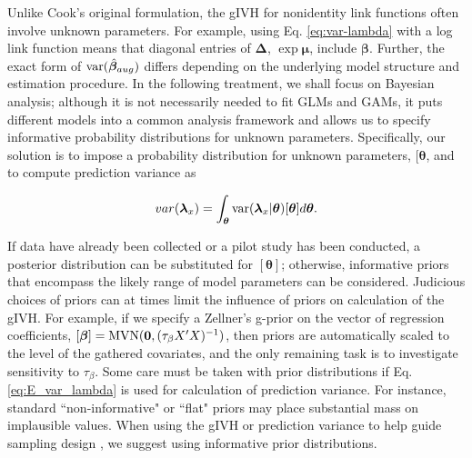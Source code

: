 \documentclass[12pt,english]{article}
\begin{document}
\begin{spacing}{1.9}
Unlike Cook's original formulation, the gIVH for nonidentity link functions often involve unknown parameters.  For example, using Eq. \ref{eq:var-lambda} with a log link function means that diagonal entries of  $\boldsymbol{\Delta}$, $\exp{\boldsymbol{\mu}}$, include $\boldsymbol{\beta}$.  Further, the exact form of ${\rm var}(\hat{\boldsymbol{\beta}}_{aug})$ differs depending on the underlying model structure and estimation procedure.  In the following treatment, we shall focus on Bayesian analysis; although it is not necessarily needed to fit GLMs and GAMs, it puts different models into a common analysis framework and allows us to specify informative probability distributions for unknown parameters.  Specifically, our solution is to impose a probability distribution for unknown parameters, $[\boldsymbol{\theta}$, and to compute prediction variance as
\begin{linenomath*}
\begin{equation}
  \label{eq:E_var_lambda}
  var(\boldsymbol{\lambda}_x) = \int_{\boldsymbol{\theta}} {\rm var}(\boldsymbol{\lambda}_x | \boldsymbol{\theta}) [\boldsymbol{\theta}] d \boldsymbol{\theta}.
\end{equation}
\end{linenomath*}

If data have already been collected or a pilot study has been conducted, a posterior distribution can be substituted for $[\boldsymbol{\theta}]$; otherwise, informative priors that encompass the likely range of model parameters can be considered.   Judicious choices of priors can at times limit the influence of priors on calculation of the gIVH.  For example, if we specify a Zellner's g-prior \citep{Zellner1986} on the vector of regression coefficients, $[\boldsymbol{\beta}] = \textrm{MVN}({\bf 0},(\tau_\beta X^\prime X)^{-1})$, then priors are automatically scaled to the level of the gathered covariates, and the only remaining task is to investigate sensitivity to $\tau_\beta$.
Some care must be taken with prior distributions if Eq. \ref{eq:E_var_lambda} is used for calculation of prediction variance.  For instance, standard ``non-informative" or ``flat" priors may place substantial mass on implausible values.  When using the gIVH or prediction variance to help guide sampling design \citep[see][for an example using prediction variance]{DiggleLophaven2006}, we suggest using informative prior distributions.


\end{spacing}
\end{document}
